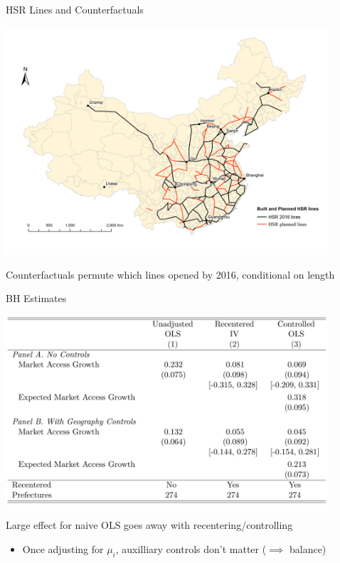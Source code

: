 \documentclass[11pt,english]{beamer}
\begin{document}
\begin{frame}{HSR Lines and Counterfactuals}

\begin{center}
	\includegraphics[width=0.9\textwidth]{figures/Lines_actual_planned.png}
\end{center}

Counterfactuals permute which lines opened by 2016, conditional on length

\end{frame}

\begin{frame}{BH Estimates}

\begin{center}
	\includegraphics[width=0.9\textwidth]{figures/hsr_tab.png}
\end{center}

Large effect for naive OLS goes away with recentering/controlling \smallskip
\begin{itemize}
\item Once adjusting for $\mu_i$, auxilliary controls don't matter ($\implies$ balance)
\end{itemize}

\end{frame}
\end{document}

